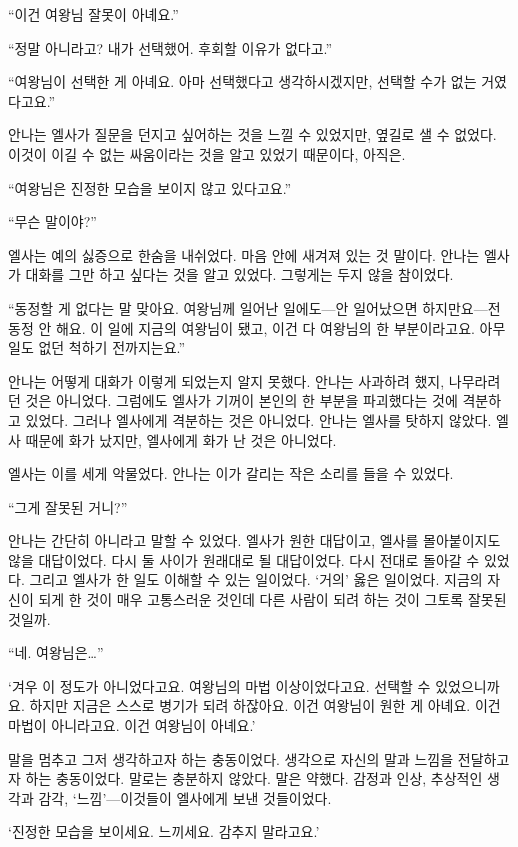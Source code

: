 ``이건 여왕님 잘못이 아녜요.''

``정말 아니라고? 내가 선택했어. 후회할 이유가 없다고.''

``여왕님이 선택한 게 아녜요. 아마 선택했다고 생각하시겠지만, 선택할 수가 없는 거였다고요.''

안나는 엘사가 질문을 던지고 싶어하는 것을 느낄 수 있었지만, 옆길로 샐 수 없었다. 이것이 이길 수 없는 싸움이라는 것을 알고 있었기 때문이다, 아직은.

``여왕님은 진정한 모습을 보이지 않고 있다고요.''

`` 무슨 말이야?''

엘사는 예의 싫증으로 한숨을 내쉬었다. 마음 안에 새겨져 있는 것 말이다. 안나는 엘사가 대화를 그만 하고 싶다는 것을 알고 있었다. 그렇게는 두지 않을 참이었다.

``동정할 게 없다는 말 맞아요. 여왕님께 일어난 일에도—안 일어났으면 하지만요—전 동정 안 해요. 이 일에 지금의 여왕님이 됐고, 이건 다 여왕님의 한 부분이라고요. 아무 일도 없던 척하기 전까지는요.''

안나는 어떻게 대화가 이렇게 되었는지 알지 못했다. 안나는 사과하려 했지, 나무라려던 것은 아니었다. 그럼에도 엘사가 기꺼이 본인의 한 부분을 파괴했다는 것에 격분하고 있었다. 그러나 엘사에게 격분하는 것은 아니었다. 안나는 엘사를 탓하지 않았다. 엘사 때문에 화가 났지만, 엘사에게 화가 난 것은 아니었다.

엘사는 이를 세게 악물었다. 안나는 이가 갈리는 작은 소리를 들을 수 있었다.

``그게 잘못된 거니?''

안나는 간단히 아니라고 말할 수 있었다. 엘사가 원한 대답이고, 엘사를 몰아붙이지도 않을 대답이었다. 다시 둘 사이가 원래대로 될 대답이었다. 다시 전대로 돌아갈 수 있었다. 그리고 엘사가 한 일도 이해할 수 있는 일이었다. `거의' 옳은 일이었다. 지금의 자신이 되게 한 것이 매우 고통스러운 것인데 다른 사람이 되려 하는 것이 그토록 잘못된 것일까.

``네. 여왕님은\ldots''

`겨우 이 정도가 아니었다고요. 여왕님의 마법 이상이었다고요. 선택할 수 있었으니까요. 하지만 지금은 스스로 병기가 되려 하잖아요. 이건 여왕님이 원한 게 아녜요. 이건 마법이 아니라고요. 이건 여왕님이 아녜요.'

말을 멈추고 그저 생각하고자 하는 충동이었다. 생각으로 자신의 말과 느낌을 전달하고자 하는 충동이었다. 말로는 충분하지 않았다. 말은 약했다. 감정과 인상, 추상적인 생각과 감각, `느낌'—이것들이 엘사에게 보낸 것들이었다.

`진정한 모습을 보이세요. 느끼세요. 감추지 말라고요.'

